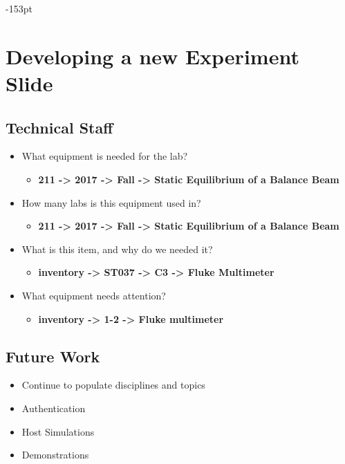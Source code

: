 \begin{adjustwidth}{}{-153pt}
\section{\bf Developing a new Experiment Slide}

\subsection{\bf Technical Staff}
\begin{itemize}
\item What equipment is needed for the lab?
	\begin{itemize} \item {\bf 211 -> 2017 -> Fall -> Static Equilibrium of a Balance Beam} \end{itemize}
\item How many labs is this equipment used in?
	\begin{itemize} \item {\bf 211 -> 2017 -> Fall -> Static Equilibrium of a Balance Beam} \end{itemize}
\item What is this item, and why do we needed it?
	\begin{itemize} \item {\bf inventory -> ST037 -> C3 -> Fluke Multimeter } \end{itemize}
\item What equipment needs attention?
	\begin{itemize} \item {\bf inventory -> 1-2 -> Fluke multimeter} \end{itemize}
\end{itemize}

\subsection{\bf Future Work}
\begin{itemize}
\item Continue to populate disciplines and topics
\item Authentication
\item Host Simulations
\item Demonstrations
\end{itemize}

\end{adjustwidth}
